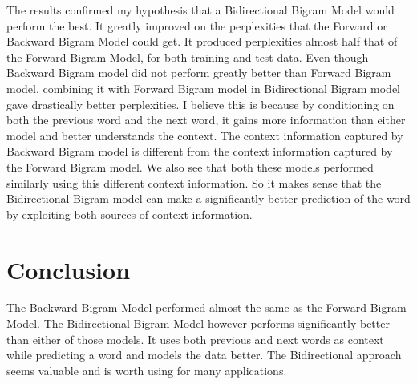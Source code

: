 \documentclass{article}
\begin{document}
The results confirmed my hypothesis that a Bidirectional Bigram Model would perform the best. It greatly improved on the perplexities that the Forward or Backward Bigram Model could get. It produced perplexities almost half that of the Forward Bigram Model, for both training and test data. Even though Backward Bigram model did not perform greatly better than Forward Bigram model, combining it with Forward Bigram model in Bidirectional Bigram model gave drastically better perplexities. I believe this is because by conditioning on both the previous word and the next word, it gains more information than either model and better understands the context. The context information captured by Backward Bigram model is different from the context information captured by the Forward Bigram model. We also see that both these models performed similarly using this different context information. So it makes sense that the Bidirectional Bigram model can make a significantly better prediction of the word by exploiting both sources of context information. 
\section{Conclusion}
The Backward Bigram Model performed almost the same as the Forward Bigram Model. The Bidirectional Bigram Model however performs significantly better than either of those models. It uses both previous and next words as context while predicting a word and models the data better. The Bidirectional approach seems valuable and is worth using for many applications.
\end{document}

